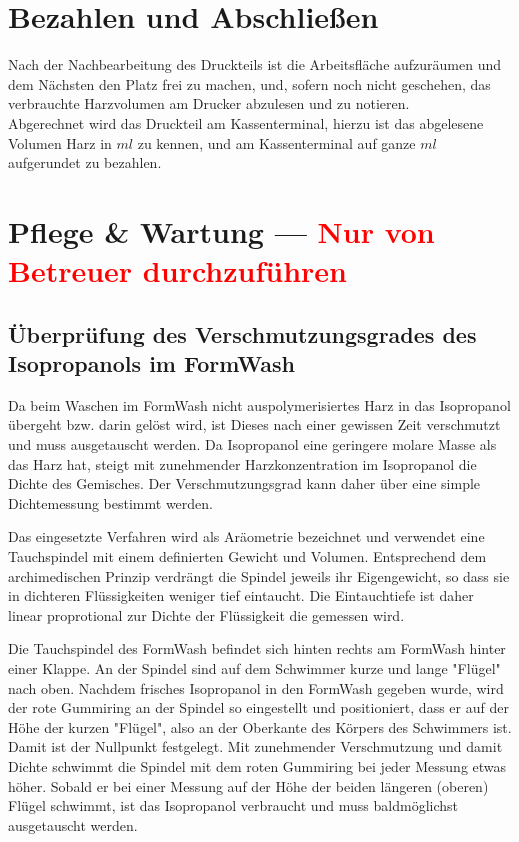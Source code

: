 \documentclass{\basedir/fablab-document}
\begin{document}

\section{Bezahlen und Abschließen}

Nach der Nachbearbeitung des Druckteils ist die Arbeitsfläche aufzuräumen und dem Nächsten den Platz frei zu machen, und, sofern noch nicht geschehen, das verbrauchte Harzvolumen am Drucker abzulesen und zu notieren.\\
Abgerechnet wird das Druckteil am Kassenterminal, hierzu ist das abgelesene Volumen Harz in $ml$ zu kennen, und am Kassenterminal auf ganze $ml$ aufgerundet zu bezahlen.


\section{Pflege \& Wartung --- \textcolor{red}{Nur von Betreuer durchzuführen}}

\subsection{Überprüfung des Verschmutzungsgrades des Isopropanols im FormWash}
Da beim Waschen im FormWash nicht auspolymerisiertes Harz in das Isopropanol übergeht bzw. darin gelöst wird, ist Dieses nach einer gewissen Zeit verschmutzt und muss ausgetauscht werden. Da Isopropanol eine geringere molare Masse als das Harz hat, steigt mit zunehmender Harzkonzentration im Isopropanol die Dichte des Gemisches. Der Verschmutzungsgrad kann daher über eine simple Dichtemessung bestimmt werden.

Das eingesetzte Verfahren wird als Aräometrie bezeichnet und verwendet eine Tauchspindel mit einem definierten Gewicht und Volumen. Entsprechend dem archimedischen Prinzip verdrängt die Spindel jeweils ihr Eigengewicht, so dass sie in dichteren Flüssigkeiten weniger tief eintaucht. Die Eintauchtiefe ist daher linear proprotional zur Dichte der Flüssigkeit die gemessen wird.

Die Tauchspindel des FormWash befindet sich hinten rechts am FormWash hinter einer Klappe. An der Spindel sind auf dem Schwimmer kurze und lange "Flügel" nach oben. Nachdem frisches Isopropanol in den FormWash gegeben wurde, wird der rote Gummiring an der Spindel so eingestellt und positioniert, dass er auf der Höhe der kurzen "Flügel", also an der Oberkante des Körpers des Schwimmers ist. Damit ist der Nullpunkt festgelegt. Mit zunehmender Verschmutzung und damit Dichte schwimmt die Spindel mit dem roten Gummiring bei jeder Messung etwas höher. Sobald er bei einer Messung auf der Höhe der beiden längeren (oberen) Flügel schwimmt, ist das Isopropanol verbraucht und muss baldmöglichst ausgetauscht werden.
\end{document}
